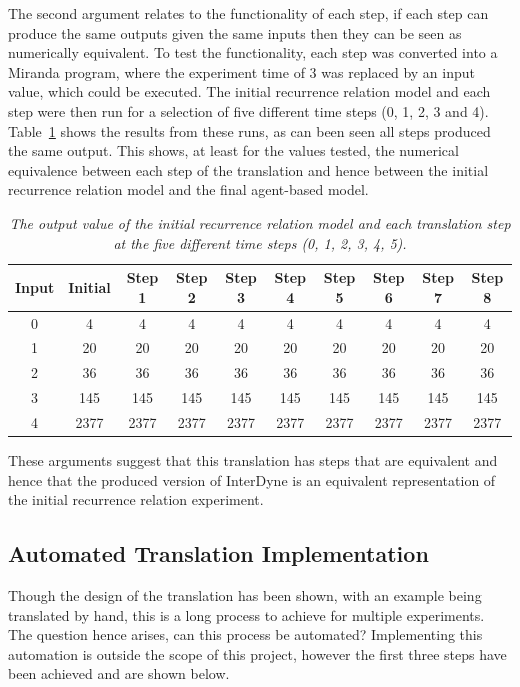 \documentclass{article}
\begin{document}
The second argument relates to the functionality of each step, if each step can produce the same outputs given the same inputs then they can be seen as numerically equivalent. To test the functionality, each step was converted into a Miranda program, where the experiment time of $3$ was replaced by an input value, which could be executed. The initial recurrence relation model and each step were then run for a selection of five different time steps (0, 1, 2, 3 and 4). Table~\ref{tbl:meanfield_compare_to_Ising} shows the results from these runs, as can been seen all steps produced the same output. This shows, at least for the values tested, the numerical equivalence between each step of the translation and hence between the initial recurrence relation model and the final agent-based model. 
\begin{table}[H]
  \caption{\it The output value of the initial recurrence relation model and each translation step at the five different time steps (0, 1, 2, 3, 4, 5).}
\begin{center}
\begin{tabular}{ c|c|c|c|c|c|c|c|c|c } 
    \hline \hline
 Input & Initial & Step 1 & Step 2 & Step 3 & Step 4 & Step 5 & Step 6 & Step 7 & Step 8 \\ 
 \hline\hline
 0 & 4 & 4 & 4 & 4 & 4 & 4 & 4 & 4 &4 \\ 
 1 & 20 & 20 & 20 & 20 & 20 & 20 & 20 & 20 &20 \\ 
 2 & 36 & 36  & 36  & 36  & 36  & 36  & 36  & 36  &36 \\ 
 3 & 145 & 145  & 145  & 145  & 145  & 145  & 145  &145  &145 \\ 
 4 & 2377 & 2377 & 2377 & 2377 & 2377 & 2377 & 2377 & 2377 &2377\\
\end{tabular}
\end{center}
  \label{tbl:meanfield_compare_to_Ising}
\end{table}

These arguments suggest that this translation has steps that are equivalent and hence that the produced version of InterDyne is an equivalent representation of the initial recurrence relation experiment. 

\subsection{Automated Translation Implementation}
Though the design of the translation has been shown, with an example being translated by hand, this is a long process to achieve for multiple experiments. The question hence arises, can this process be automated? Implementing this automation is outside the scope of this project, however the first three steps have been achieved and are shown below. 
\end{document}
